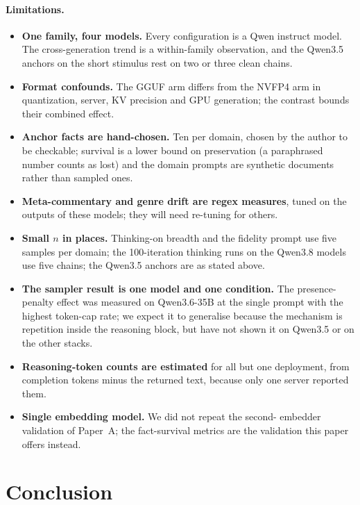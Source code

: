 \documentclass[11pt]{article}
\begin{document}
\paragraph{Limitations.}
\begin{itemize}[leftmargin=*]
  \item \textbf{One family, four models.} Every configuration is a Qwen
        instruct model. The cross-generation trend is a within-family
        observation, and the Qwen3.5 anchors on the short stimulus rest on
        two or three clean chains.
  \item \textbf{Format confounds.} The GGUF arm differs from the NVFP4 arm
        in quantization, server, KV precision and GPU generation; the
        contrast bounds their combined effect.
  \item \textbf{Anchor facts are hand-chosen.} Ten per domain, chosen by the
        author to be checkable; survival is a lower bound on preservation
        (a paraphrased number counts as lost) and the domain prompts are
        synthetic documents rather than sampled ones.
  \item \textbf{Meta-commentary and genre drift are regex measures}, tuned
        on the outputs of these models; they will need re-tuning for others.
  \item \textbf{Small $n$ in places.} Thinking-on breadth and the fidelity
        prompt use five samples per domain; the 100-iteration thinking runs
        on the Qwen3.8 models use five chains; the Qwen3.5 anchors are as
        stated above.
  \item \textbf{The sampler result is one model and one condition.} The
        presence-penalty effect was measured on Qwen3.6-35B at the single
        prompt with the highest token-cap rate; we expect it to generalise
        because the mechanism is repetition inside the reasoning block, but
        have not shown it on Qwen3.5 or on the other stacks.
  \item \textbf{Reasoning-token counts are estimated} for all but one
        deployment, from completion tokens minus the returned text, because
        only one server reported them.
  \item \textbf{Single embedding model.} We did not repeat the second-
        embedder validation of Paper~A; the fact-survival metrics are the
        validation this paper offers instead.
\end{itemize}

\section{Conclusion}
\label{sec:conclusion}
\end{document}
